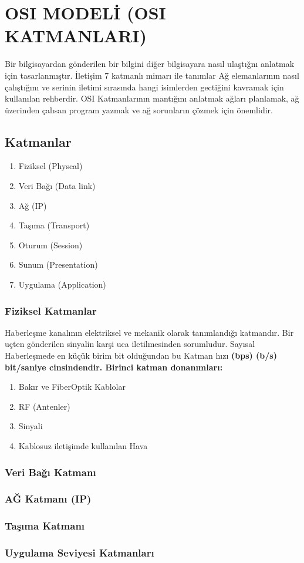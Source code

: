\section{OSI MODELİ (OSI KATMANLARI)}
Bir bilgisayardan gönderilen bir bilgini diğer bilgisayara nasıl ulaştığnı anlatmak için tasarlanmıştır.
İletişim 7 katmanlı mimarı ile tanımlar Ağ elemanlarının nasıl çalıştığını ve serinin iletimi sırasında hangi isimlerden gectiğini kavramak için kullanılan rehberdir.
OSI Katmanlarının mantığını anlatmak ağları planlamak, ağ üzerinden çalısan program yazmak ve ağ sorunların çözmek için önemlidir.
\subsection{Katmanlar}
\begin{enumerate}
	\item Fiziksel (Physcal)
	\item Veri Bağı (Data link)
	\item Ağ (IP)
	\item Taşıma (Transport)
	\item Oturum (Session)
	\item Sunum (Presentation)
	\item Uygulama (Application)
\end{enumerate}

\subsubsection{Fiziksel Katmanlar}
Haberleşme kanalının elektriksel ve mekanik olarak tanımlandığı katmandır. Bir uçten gönderilen sinyalin karşi uca iletilmesinden sorumludur. Sayısal Haberleşmede en küçük birim bit olduğundan bu Katman hızı \bf{(bps) (b/s) bit/saniye} cinsindendir.
Birinci katman donanımları:
\begin{enumerate}
	\item Bakır ve FiberOptik Kablolar
	\item RF (Antenler)
	\item Sinyali
	\item Kablosuz iletişimde kullanılan Hava
\end{enumerate}

\subsubsection{Veri Bağı Katmanı}


\subsubsection{AĞ Katmanı (IP) }

\subsubsection{Taşıma Katmanı}

\subsubsection{Uygulama Seviyesi Katmanları}

